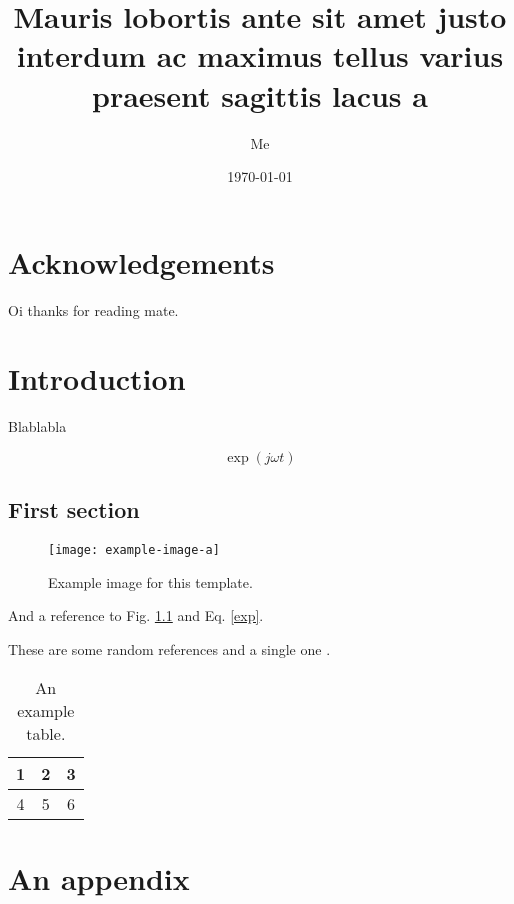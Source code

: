 \documentclass{cpa-thesis}
\title{Mauris lobortis ante sit amet justo interdum ac maximus tellus varius praesent sagittis lacus a}
\author{Me}
\date{\today}
\begin{document}

    \maketitle

    \chapter*{Acknowledgements}

    Oi thanks for reading mate.

    \tableofcontents

    \listoffigures

    \listoftables
    

    \chapter{Introduction}

    Blablabla

    \blindtext[5]

    \begin{equation}
        \exp{(j \omega t)}  \label{exp} 
    \end{equation}

    \section{First section}

    \begin{figure}
        \centering
        \texttt{[image: example-image-a]}
        \caption[Example image]{Example image for this template.}
        \label{example-fig}
    \end{figure}

    \blindtext[5] And a reference to Fig. \ref{example-fig} and Eq. \ref{exp}. 

    These are some random references \cite{einstein,knuth-fa,dirac,knuthwebsite} and a single one \cite{knuth-fa}.

    \begin{table}
        \centering
        \begin{tabular}{ccc}
            \toprule
            1 & 2 & 3 \\
            \midrule
            4 & 5 & 6 \\
            \hline
        \end{tabular}
        \caption[A table]{An example table.}
        \label{example-table}
    \end{table}

    \appendix

    \chapter{An appendix}

    \blindtext

    \printbibliography
\end{document}
